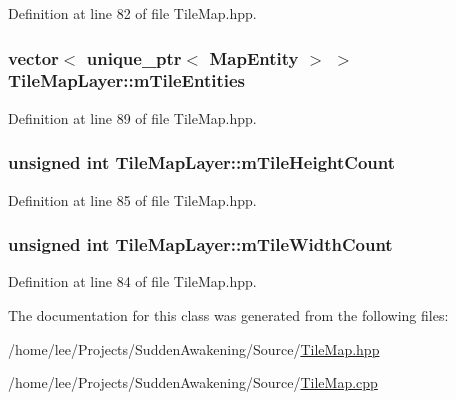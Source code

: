 Definition at line 82 of file Tile\-Map.\-hpp.

\hypertarget{class_tile_map_layer_a9c9c569f4c2f5de09b5541d079f5f97a}{
\subsubsection[{m\-Tile\-Entities}]{\setlength{\rightskip}{0pt plus 5cm}vector$<$ unique\-\_\-ptr$<$ {\bf Map\-Entity} $>$ $>$ Tile\-Map\-Layer\-::m\-Tile\-Entities\hspace{0.3cm}{\ttfamily [protected]}}}\label{class_tile_map_layer_a9c9c569f4c2f5de09b5541d079f5f97a}


Definition at line 89 of file Tile\-Map.\-hpp.

\hypertarget{class_tile_map_layer_ad3731c3f3e38579327eb1a6b40e74af3}{
\subsubsection[{m\-Tile\-Height\-Count}]{\setlength{\rightskip}{0pt plus 5cm}unsigned int Tile\-Map\-Layer\-::m\-Tile\-Height\-Count\hspace{0.3cm}{\ttfamily [protected]}}}\label{class_tile_map_layer_ad3731c3f3e38579327eb1a6b40e74af3}


Definition at line 85 of file Tile\-Map.\-hpp.

\hypertarget{class_tile_map_layer_a1f7ed47471eae14e321db6e2da4d0547}{
\subsubsection[{m\-Tile\-Width\-Count}]{\setlength{\rightskip}{0pt plus 5cm}unsigned int Tile\-Map\-Layer\-::m\-Tile\-Width\-Count\hspace{0.3cm}{\ttfamily [protected]}}}\label{class_tile_map_layer_a1f7ed47471eae14e321db6e2da4d0547}


Definition at line 84 of file Tile\-Map.\-hpp.



The documentation for this class was generated from the following files\-:\begin{DoxyCompactItemize}
\item 
/home/lee/\-Projects/\-Sudden\-Awakening/\-Source/\hyperlink{_tile_map_8hpp}{Tile\-Map.\-hpp}\item 
/home/lee/\-Projects/\-Sudden\-Awakening/\-Source/\hyperlink{_tile_map_8cpp}{Tile\-Map.\-cpp}\end{DoxyCompactItemize}
